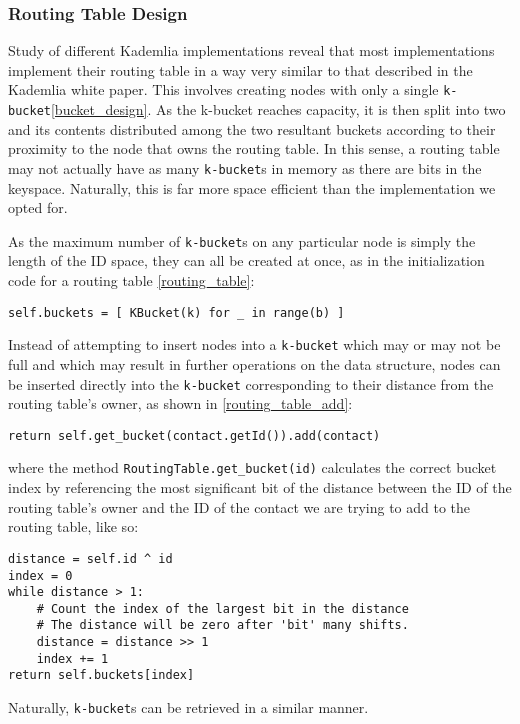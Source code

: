 \documentclass[12pt]{report}
\newcommand{\code}[1]{\colorbox{codegray}{\texttt{#1}}}
\begin{document}
            \subsubsection{Routing Table Design\label{routing_table_design}}
                Study of different Kademlia
                implementations\cite{implementation_01}\cite{implementation_02}\cite{implementation_03}\cite{implementation_04}
                reveal that most implementations implement their routing table
                in a way very similar to that described in the Kademlia white
                paper\cite{kademlia}.  This involves creating nodes with only a
                single \code{k-bucket}\ref{bucket_design}.  As the k-bucket
                reaches capacity, it is then split into two and its contents
                distributed among the two resultant buckets according to their
                proximity to the node that owns the routing table.  In this
                sense, a routing table may not actually have as many
                \code{k-bucket}s
                in memory as there are bits in the keyspace.  Naturally, this
                is far more space efficient than the implementation we opted
                for.

                As the maximum number of \code{k-bucket}s on any particular
                node is simply the length of the ID space, they can all be
                created at once, as in the initialization code for a routing
                table \ref{routing_table}:
\begin{lstlisting}[label=routing_table, caption={RoutingTable()}]
self.buckets = [ KBucket(k) for _ in range(b) ]
\end{lstlisting}
                Instead of attempting to insert nodes into a \code{k-bucket}
                which may or may not be full and which may result in further
                operations on the data structure, nodes can be inserted
                directly into the \code{k-bucket} corresponding to their
                distance from the routing table's owner, as shown in
                \ref{routing_table_add}:
\begin{lstlisting}[label=routing_table_add, caption=RoutingTable.add()]
return self.get_bucket(contact.getId()).add(contact)
\end{lstlisting}
                where the method \code{RoutingTable.get\_bucket(id)} calculates
                the correct bucket index by referencing the most significant
                bit of the distance between the ID of the routing table's owner
                and the ID of the contact we are trying to add to the routing
                table, like so:
\begin{lstlisting}[label=routing_table_get_bucket, caption={RoutingTable.get\_bucket()}]
distance = self.id ^ id
index = 0
while distance > 1:
    # Count the index of the largest bit in the distance
    # The distance will be zero after 'bit' many shifts.
    distance = distance >> 1
    index += 1
return self.buckets[index]
\end{lstlisting}
                Naturally, \code{k-bucket}s can be retrieved in a similar
                manner.
                
\end{document}
